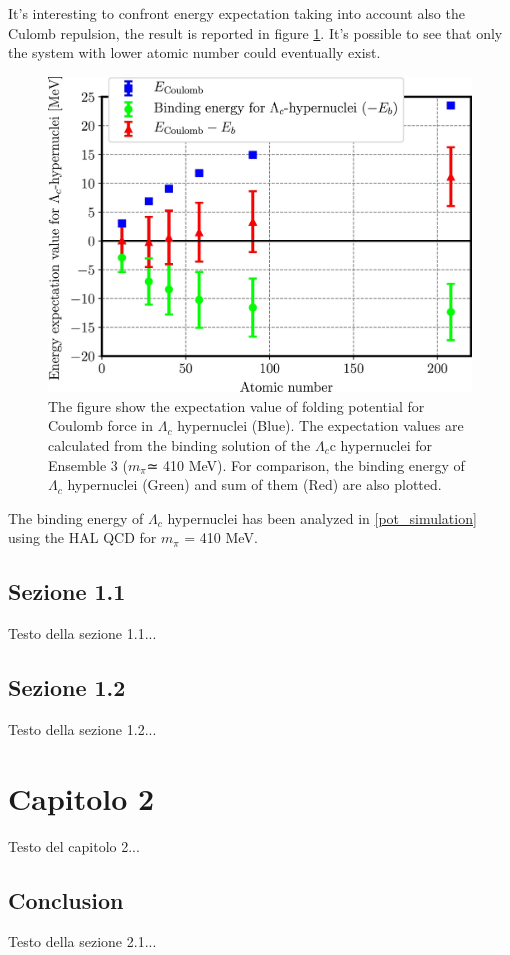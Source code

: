 \documentclass[12pt,a4paper]{book}
\begin{document}
	It's interesting to confront energy expectation taking into account also the Culomb repulsion, the result is reported in figure \ref{fig:binding_culomb}. It's possible to see that only the system with lower atomic number could eventually exist.
	
	\begin{figure}
		\centering
		\includegraphics[width=0.74 \linewidth]{pictures/binding_culomb.jpg}
		\caption{ The figure show the expectation value of folding potential for Coulomb force in $\Lambda_c$ hypernuclei (Blue). The expectation values are calculated from the binding solution of the $\Lambda_c$c hypernuclei for Ensemble 3 ($m_\pi$≃ 410 MeV). For comparison, the binding energy of $\Lambda_c$ hypernuclei (Green) and sum of them (Red) are also plotted.}
		\label{fig:binding_culomb}
	\end{figure}
	 
	
	
	
	The binding energy of $\Lambda_c$ hypernuclei has been analyzed in \ref{pot_simulation} using the HAL QCD for $m_\pi$ = 410 MeV. 
	
	
	\newpage
	
	\subsection{Sezione 1.1}
	Testo della sezione 1.1...
	
	\newpage
	
	\subsection{Sezione 1.2}
	Testo della sezione 1.2...
	
	\newpage
	
	\section{Capitolo 2}
	Testo del capitolo 2...
	
	\newpage
	
	\subsection{Conclusion}
	Testo della sezione 2.1...
	
	\medskip
	
	\printbibliography
	
\end{document}
